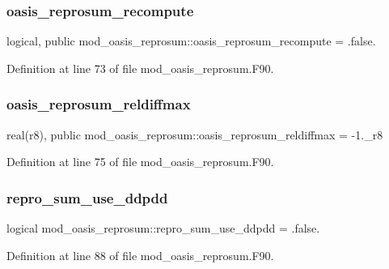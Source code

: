 \subsubsection{\texorpdfstring{oasis\+\_\+reprosum\+\_\+recompute}{oasis\_reprosum\_recompute}}
{\footnotesize\ttfamily logical, public mod\+\_\+oasis\+\_\+reprosum\+::oasis\+\_\+reprosum\+\_\+recompute = .false.}



Definition at line 73 of file mod\+\_\+oasis\+\_\+reprosum.\+F90.

\mbox{\label{namespacemod__oasis__reprosum_a6a80f4226d35d0842617e6eb6c9406e1}} 
\subsubsection{\texorpdfstring{oasis\+\_\+reprosum\+\_\+reldiffmax}{oasis\_reprosum\_reldiffmax}}
{\footnotesize\ttfamily real(r8), public mod\+\_\+oasis\+\_\+reprosum\+::oasis\+\_\+reprosum\+\_\+reldiffmax = -\/1.\+\_\+r8}



Definition at line 75 of file mod\+\_\+oasis\+\_\+reprosum.\+F90.

\mbox{\label{namespacemod__oasis__reprosum_aab06d0de9a82726d347ac52bb276355d}} 
\subsubsection{\texorpdfstring{repro\+\_\+sum\+\_\+use\+\_\+ddpdd}{repro\_sum\_use\_ddpdd}}
{\footnotesize\ttfamily logical mod\+\_\+oasis\+\_\+reprosum\+::repro\+\_\+sum\+\_\+use\+\_\+ddpdd = .false.\hspace{0.3cm}{\ttfamily [private]}}



Definition at line 88 of file mod\+\_\+oasis\+\_\+reprosum.\+F90.

